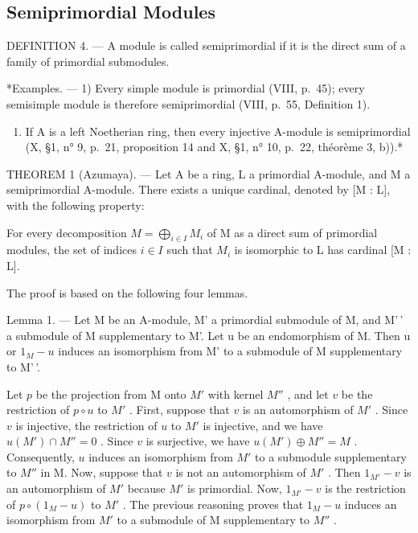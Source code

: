 \subsection{Semiprimordial Modules}

DEFINITION 4. --- A module is called semiprimordial if it is the direct sum of a family of primordial submodules.

*Examples. --- 1) Every simple module is primordial (VIII, p.~45); every semisimple module is therefore semiprimordial (VIII, p.~55, Definition 1).

\begin{enumerate}
\def\labelenumi{\arabic{enumi})}
\setcounter{enumi}{1}
\tightlist
\item
  If A is a left Noetherian ring, then every injective A-module is semiprimordial (X, §1, n° 9, p.~21, proposition 14 and X, §1, n° 10, p.~22, théorème 3, b)).*
\end{enumerate}

THEOREM 1 (Azumaya). --- Let A be a ring, L a primordial A-module, and M a semiprimordial A-module. There exists a unique cardinal, denoted by {[}M : L{]}, with the following property:

For every decomposition \(M = \bigoplus_{i \in I} M_i\) of M as a direct sum of primordial modules, the set of indices \(i \in I\) such that \(M_i\) is isomorphic to L has cardinal {[}M : L{]}.

The proof is based on the following four lemmas.

Lemma 1. --- Let M be an A-module, M' a primordial submodule of M, and M'\,' a submodule of M supplementary to M'. Let u be an endomorphism of M. Then u or \(1_{M} - u\) induces an isomorphism from M' to a submodule of M supplementary to M'\,'.

Let \(p\) be the projection from M onto \(M'\) with kernel \(M''\) , and let \(v\) be the restriction of \(p \circ u\) to \(M'\) . First, suppose that \(v\) is an automorphism of \(M'\) . Since \(v\) is injective, the restriction of \(u\) to \(M'\) is injective, and we have \(u(M') \cap M'' = 0\) . Since \(v\) is surjective, we have \(u(M') \oplus M'' = M\) . Consequently, \(u\) induces an isomorphism from \(M'\) to a submodule supplementary to \(M''\) in M. Now, suppose that \(v\) is not an automorphism of \(M'\) . Then \(1_{M'} - v\) is an automorphism of \(M'\) because \(M'\) is primordial. Now, \(1_{M'} - v\) is the restriction of \(p \circ (1_M - u)\) to \(M'\) . The previous reasoning proves that \(1_M - u\) induces an isomorphism from \(M'\) to a submodule of M supplementary to \(M''\) .

